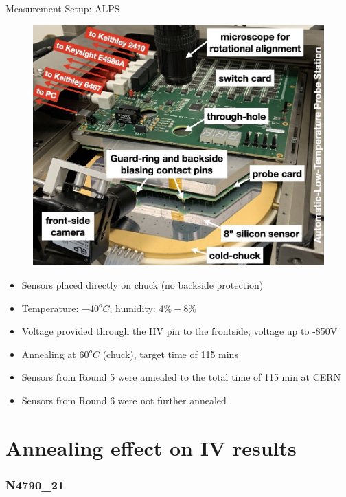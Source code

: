 \documentclass{beamer}
\begin{document}
\begin{frame}{Measurement Setup: ALPS}
    \begin{figure}
        \includegraphics[width=.45\textwidth]{plots/ALPS_setup.png}
    \end{figure}
  
    \begin{itemize}
        \scriptsize
        \item Sensors placed directly on chuck (no backside protection)
        \item Temperature: $-40^oC$; humidity: $ 4\% - 8\%$
        \item Voltage provided through the HV pin to the frontside;  voltage up to \alert{-850V}
        \item Annealing at $60^oC$ (chuck), target time of 115 mins
        \item Sensors from Round 5 were annealed to the total time of 115 min at CERN 
        \item Sensors from Round 6 were not further annealed
    \end{itemize}
\end{frame}
  

\section{Annealing effect on IV results}

\subsubsection{N4790\_21}
\end{document}
